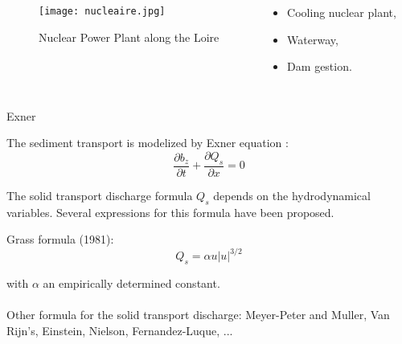 \begin{frame}
\begin{columns}
\begin{figure}
\texttt{[image: nucleaire.jpg]}
\caption{Nuclear Power Plant along the Loire}
\end{figure}
\begin{itemize}
\item Cooling nuclear plant,
\item Waterway,
\item Dam gestion.
\end{itemize}
\end{columns}
\end{frame}

\begin{frame}{Exner}
  \begin{block}{The sediment transport is modelized by Exner equation :}
    \begin{equation}
      \frac{\partial b_z}{\partial t}+\frac{\partial Q_s}{\partial x}=0
    \end{equation}
  \end{block}
  The solid transport discharge formula $Q_s$ depends on the hydrodynamical variables.
  Several expressions for this formula have been proposed.

  \begin{block}{Grass formula (1981):}
    \begin{equation}
      Q_s = \alpha u | u |^{3/2}
    \end{equation}
  \end{block}
with $\alpha$ an empirically determined constant.\\~\\

Other formula for the solid transport discharge: Meyer-Peter and Muller, Van Rijn's, Einstein, Nielson, Fernandez-Luque, ... 

\end{frame}

